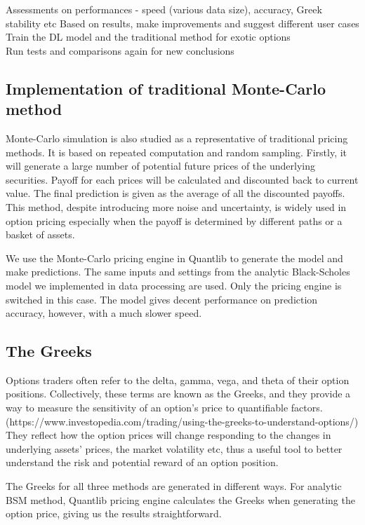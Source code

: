 \documentclass{report}
\begin{document}
Assessments on performances - speed (various data size), accuracy, Greek stability etc
Based on results, make improvements and suggest different user cases\\
Train the DL model and the traditional method for exotic options\\
Run tests and comparisons again for new conclusions

\subsection{Implementation of  traditional Monte-Carlo method}
Monte-Carlo simulation is also studied as a representative of traditional pricing methods. It is based on repeated computation and random sampling. Firstly, it will generate a large number of potential future prices of the underlying securities. Payoff for each prices will be calculated and discounted back to current value. The final prediction is given as the average of all the discounted payoffs. This method, despite introducing more noise and uncertainty,  is widely used in option pricing especially when the payoff is determined by different paths or a basket of assets. 

We use the Monte-Carlo pricing engine in Quantlib to generate the model and make predictions.  The same inputs and settings from the analytic Black-Scholes model we implemented in data processing are used. Only the pricing engine is switched in this case. The model gives decent performance on prediction accuracy, however, with a much slower speed.

\subsection{The Greeks}

Options traders often refer to the delta, gamma, vega, and theta of their option positions. Collectively, these terms are known as the Greeks, and they provide a way to measure the sensitivity of an option's price to quantifiable factors. (https://www.investopedia.com/trading/using-the-greeks-to-understand-options/) They reflect how the option prices will change responding to the changes in underlying assets' prices, the market volatility etc, thus a useful tool to better understand the risk and potential reward of an option position. 

The Greeks for all three methods are generated in different ways. For analytic BSM method, Quantlib pricing engine calculates the Greeks when generating the option price,  giving us the results straightforward. 
\end{document}

